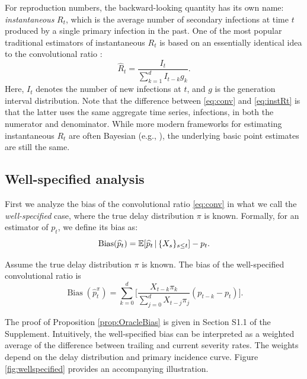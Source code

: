 \documentclass{article}
\renewcommand{\hat}{\widehat} %
\newcommand{\given}{\, \vert \,}
\DeclareMathOperator{\bias}{Bias}
\begin{document}
For reproduction numbers, the backward-looking quantity has its own name:
\emph{instantaneous} $R_t$, which is the average number of secondary infections
at time $t$ produced by a single primary infection in the past. One of the most
popular traditional estimators of instantaneous $R_t$ is based on an essentially 
identical idea to the convolutional ratio \citep{fraser2007, wallinga2007how}: 
\begin{equation}
\label{eq:instRt}
\hat{R}_t = \frac{I_t}{\sum_{k=1}^d I_{t-k} g_k}.
\end{equation}
Here, $I_t$ denotes the number of new infections at $t$, and $g$ is the
generation interval distribution. Note that the difference between
\eqref{eq:conv} and \eqref{eq:instRt} is that the latter uses the same aggregate 
time series, infections, in both the numerator and denominator. While more
modern frameworks for estimating instantaneous $R_t$ are often Bayesian (e.g.,
\citealp{cori2013new}), the underlying basic point estimates are still the same.

\subsection{Well-specified analysis}
\label{sec:wellspecified}

First we analyze the bias of the convolutional ratio \eqref{eq:conv} in what we  
call the \emph{well-specified} case, where the true delay distribution $\pi$ is 
known. Formally, for an estimator \smash{$\hat{p}_t$} of $p_t$, we define its
bias as:     
\[
\bias(\hat{p}_t) = \E[\hat{p}_t \given \{X_s\}_{s\leq t}] - p_t. 
\]

\begin{proposition}
\label{prop:OracleBias}
Assume the true delay distribution $\pi$ is known.
The bias of the well-specified convolutional ratio \smash{$\hat{p}_t^\pi$} is 
\begin{equation}
\label{eq:OracleBias}
\bias(\hat{p}_t^\pi)  = \sum_{k=0}^d \Bigg[ \frac{X_{t-k}\pi_k}{\sum_{j=0}^d
  X_{t-j}\pi_j} (p_{t-k}-p_t) \Bigg]. 
\end{equation}
\end{proposition}

The proof of Proposition \ref{prop:OracleBias} is given in
Section S1.1 of the Supplement. 
Intuitively, the well-specified bias can be interpreted as a weighted average of the difference between trailing and current severity rates. 
The weights depend on the delay distribution and primary incidence curve.
Figure \ref{fig:wellspecified} provides an accompanying illustration.     
\end{document}
